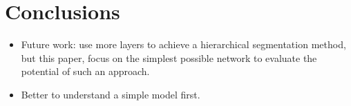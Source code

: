 \section{Conclusions}

\begin{itemize}
\item Future work: use more layers to achieve a hierarchical segmentation
method, but this paper, focus on the simplest possible network to evaluate the
potential of such an approach.
\item Better to understand a simple model first.
\end{itemize}

